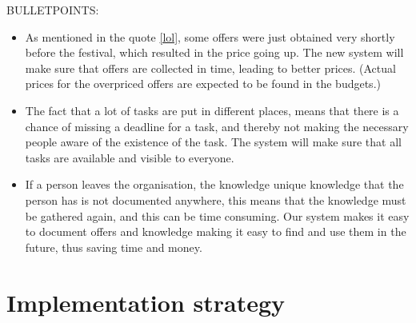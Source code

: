 BULLETPOINTS:
\begin{itemize}
    \item As mentioned in the quote \ref{lol}, some offers were just obtained very shortly before
    the festival, which resulted in the price going up. The new system will make sure that offers
    are collected in time, leading to better prices. (Actual prices for the overpriced offers are
    expected to be found in the budgets.)
    \item The fact that a lot of tasks are put in different places, means that there is a chance of
    missing a deadline for a task, and thereby not making the necessary people aware of the
    existence of the task. The system will make sure that all tasks are available and visible to
    everyone.
    \item If a person leaves the organisation, the knowledge unique knowledge that the person has is
    not documented anywhere, this means that the knowledge must be gathered again, and this can be
    time consuming. Our system makes it easy to document offers and knowledge making it easy to find
    and use them in the future, thus saving time and money.
\end{itemize}

\section{Implementation strategy}


